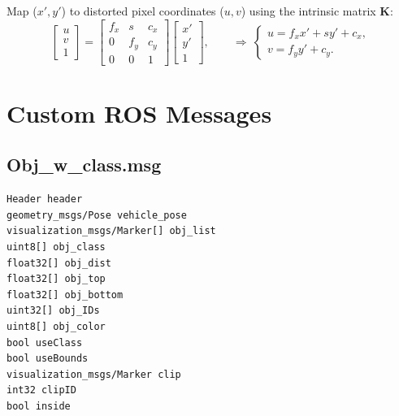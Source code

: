 \documentclass{erauthesis}
\begin{document}
Map ($x', y'$) to distorted pixel coordinates ($u,v$) using the intrinsic matrix $\mathbf{K}$:
\begin{equation}
\begin{bmatrix} u \\ v \\ 1 \end{bmatrix}
=
\begin{bmatrix}
f_x & s & c_x \\
0   & f_y & c_y \\
0   & 0   & 1
\end{bmatrix}
\begin{bmatrix} x' \\ y' \\ 1 \end{bmatrix},
\qquad
\Rightarrow\ 
\begin{cases}
u = f_x x' + s y' + c_x,\\
v = f_y y' + c_y.
\end{cases}
\label{eq:intrinsics_to_pixels}
\end{equation}

\chapter{Custom ROS Messages}
\section*{Obj\_w\_class.msg}
\begin{verbatim}
Header header
geometry_msgs/Pose vehicle_pose
visualization_msgs/Marker[] obj_list
uint8[] obj_class
float32[] obj_dist
float32[] obj_top
float32[] obj_bottom
uint32[] obj_IDs
uint8[] obj_color
bool useClass
bool useBounds
visualization_msgs/Marker clip
int32 clipID
bool inside
\end{verbatim}

%        
\end{document}
